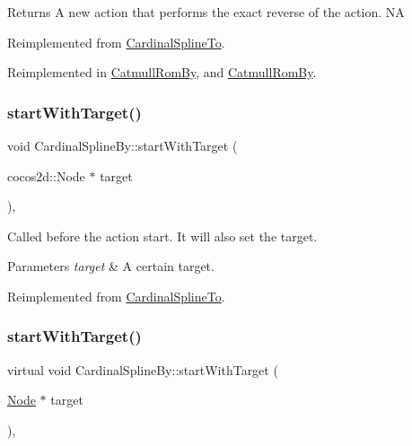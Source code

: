 \begin{DoxyReturn}{Returns}
A new action that performs the exact reverse of the action.  NA 
\end{DoxyReturn}


Reimplemented from \hyperlink{classCardinalSplineTo_aecb2ad46af2d58995820c9dfc1f6459f}{Cardinal\+Spline\+To}.



Reimplemented in \hyperlink{classCatmullRomBy_ab489930d039c543d5965637ed50420d3}{Catmull\+Rom\+By}, and \hyperlink{classCatmullRomBy_a2f027f2c6627f98ffcc75a64ff6b0cd0}{Catmull\+Rom\+By}.

\mbox{\label{classCardinalSplineBy_aaf4bff6ebce3d2ccf6dfaa71678d4462}} 
\subsubsection{\texorpdfstring{start\+With\+Target()}{startWithTarget()}\hspace{0.1cm}{\footnotesize\ttfamily [1/2]}}
{\footnotesize\ttfamily void Cardinal\+Spline\+By\+::start\+With\+Target (\begin{DoxyParamCaption}\item[{cocos2d\+::\+Node $\ast$}]{target }\end{DoxyParamCaption})\hspace{0.3cm}{\ttfamily [override]}, {\ttfamily [virtual]}}

Called before the action start. It will also set the target.


\begin{DoxyParams}{Parameters}
{\em target} & A certain target. \\
\hline
\end{DoxyParams}


Reimplemented from \hyperlink{classCardinalSplineTo_ab1e28aab8fe748bd90cc370efc52bef5}{Cardinal\+Spline\+To}.

\mbox{\label{classCardinalSplineBy_a913fc62fee3b78dcdeb76b9bf8d05b35}} 
\subsubsection{\texorpdfstring{start\+With\+Target()}{startWithTarget()}\hspace{0.1cm}{\footnotesize\ttfamily [2/2]}}
{\footnotesize\ttfamily virtual void Cardinal\+Spline\+By\+::start\+With\+Target (\begin{DoxyParamCaption}\item[{\hyperlink{classNode}{Node} $\ast$}]{target }\end{DoxyParamCaption})\hspace{0.3cm}{\ttfamily [override]}, {\ttfamily [virtual]}}

